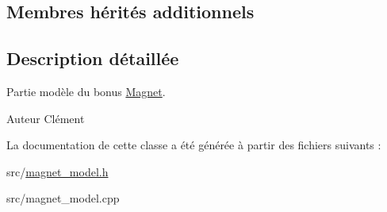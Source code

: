 \subsection*{Membres hérités additionnels}


\subsection{Description détaillée}
Partie modèle du bonus \hyperlink{class_magnet}{Magnet}. 

\begin{DoxyAuthor}{Auteur}
Clément 
\end{DoxyAuthor}


La documentation de cette classe a été générée à partir des fichiers suivants \+:\begin{DoxyCompactItemize}
\item 
src/\hyperlink{magnet__model_8h}{magnet\+\_\+model.\+h}\item 
src/magnet\+\_\+model.\+cpp\end{DoxyCompactItemize}
